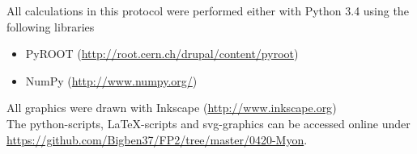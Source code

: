 \documentclass[12pt, a4paper]{scrartcl}
\title{\exptitle}
\subtitle{Fortgeschrittenen-Praktikum 1}
\author{Moritz Bitterling und Benjamin Rottler \\ Universität Freiburg}
\date{\expdate}
\numberwithin{equation}{section} %
\numberwithin{table}{section}    %
\begin{document}
\hypersetup{pageanchor=false} %

\thispagestyle{empty}

\newpage
All calculations in this protocol were performed either with Python 3.4 using the following libraries
\begin{itemize}
  \item PyROOT (\url{http://root.cern.ch/drupal/content/pyroot})
  \item NumPy (\url{http://www.numpy.org/})
\end{itemize}
All graphics were drawn with Inkscape (\url{http://www.inkscape.org})\\[\baselineskip]
The python-scripts, \LaTeX-scripts and svg-graphics can be accessed online under
\url{https://github.com/Bigben37/FP2/tree/master/0420-Myon}. %
\thispagestyle{empty}

\newpage
\tableofcontents
\thispagestyle{empty}

\newpage
\hypersetup{pageanchor=true} %
\setcounter{page}{1} %

 





%
\end{document}
